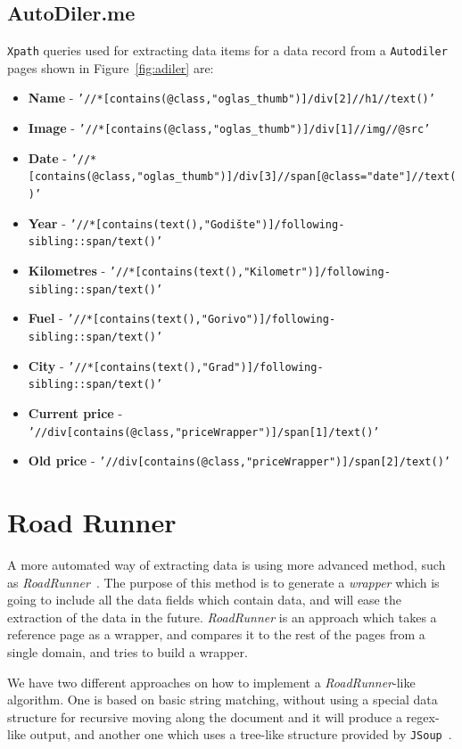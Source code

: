 \documentclass{article}
\begin{document}
	\subsection{AutoDiler.me}
	\texttt{Xpath} queries used for extracting data items for a data record from a \texttt{Autodiler} pages shown in Figure~\ref{fig:adiler} are:
	\begin{itemize}
		\item \textbf{Name} - \texttt{'//*[contains(@class,"oglas\_thumb")]/div[2]//h1//text()'} 
		\item \textbf{Image} - \texttt{'//*[contains(@class,"oglas\_thumb")]/div[1]//img//@src'}
		\item \textbf{Date} - \texttt{'//*[contains(@class,"oglas\_thumb")]/div[3]//span[@class="date"]//text()'} 
		\item \textbf{Year} - \texttt{'//*[contains(text(),"Godište")]/following-sibling::span/text()'} 
		\item \textbf{Kilometres} - \texttt{'//*[contains(text(),"Kilometr")]/following-sibling::span/text()'} 
		\item \textbf{Fuel} - \texttt{'//*[contains(text(),"Gorivo")]/following-sibling::span/text()'}  
		\item \textbf{City} - \texttt{'//*[contains(text(),"Grad")]/following-sibling::span/text()'} 
		\item \textbf{Current price} - \texttt{'//div[contains(@class,"priceWrapper")]/span[1]/text()'} 
		\item \textbf{Old price} - \texttt{'//div[contains(@class,"priceWrapper")]/span[2]/text()'} 
	\end{itemize}
	
	\section{Road Runner}
	A more automated way of extracting data is using more advanced method, such as \textit{RoadRunner}~\cite{crescenzi2001roadrunner}. The purpose of this method is to generate a \textit{wrapper} which is going to include all the data fields which contain data, and will ease the extraction of the data in the future. \textit{RoadRunner} is an approach which takes a reference page as a wrapper, and compares it to the rest of the pages from a single domain, and tries to build a wrapper.
	
	We have two different approaches on how to implement a \textit{RoadRunner}-like algorithm. One is based on basic string matching, without using a special data structure for recursive moving along the document and it will produce a regex-like output, and another one which uses a tree-like structure provided by \texttt{JSoup}~\cite{jsoup}.
	
\end{document}
